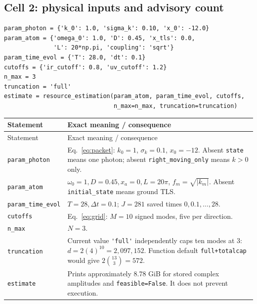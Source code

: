 \documentclass[11pt,a4paper]{article}
\newcommand{\code}[1]{\nolinkurl{#1}}
\begin{document}
\subsection{Cell 2: physical inputs and advisory count}
\begin{lstlisting}
param_photon = {'k_0': 1.0, 'sigma_k': 0.10, 'x_0': -12.0}
param_atom = {'omega_0': 1.0, 'D': 0.45, 'x_tls': 0.0,
              'L': 20*np.pi, 'coupling': 'sqrt'}
param_time_evol = {'T': 28.0, 'dt': 0.1}
cutoffs = {'ir_cutoff': 0.8, 'uv_cutoff': 1.2}
n_max = 3
truncation = 'full'
estimate = resource_estimation(param_atom, param_time_evol, cutoffs,
                               n_max=n_max, truncation=truncation)
\end{lstlisting}
\begin{longtable}{p{}p{}}
\toprule Statement & Exact meaning / consequence\\\midrule\endfirsthead
\toprule Statement & Exact meaning / consequence\\\midrule\endhead
\code{param_photon} & Eq.~\eqref{eq:packet}: $k_0=1$, $\sigma_k=0.1$, $x_0=-12$. Absent \code{state} means one photon; absent \code{right_moving_only} means $k>0$ only.\\
\code{param_atom} & $\omega_0=1,D=0.45,x_a=0,L=20\pi$, $f_m=\sqrt{|k_m|}$. Absent \code{initial_state} means ground TLS.\\
\code{param_time_evol} & $T=28,\Delta t=0.1$; $J=281$ saved times $0,0.1,\ldots,28$.\\
\code{cutoffs} & Eq.~\eqref{eq:grid}: $M=10$ signed modes, five per direction.\\
\code{n_max} & $N=3$.\\
\code{truncation} & Current value \code{'full'} independently caps ten modes at 3: $d=2(4)^{10}=2{,}097{,}152$. Function default \code{full+totalcap} would give $2\binom{13}{3}=572$.\\
\code{estimate} & Prints approximately 8.78 GiB for stored complex amplitudes and \code{feasible=False}. It does not prevent execution.\\
\bottomrule
\end{longtable}
\end{document}
